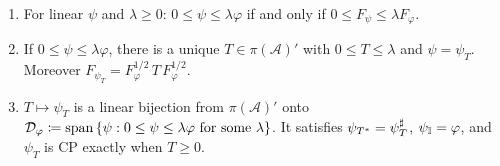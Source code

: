 \documentclass[12pt]{article}
\newcommand{\alg}{\mathcal{A}}             %
\newcommand{\Fphi}{F_{\varphi}}
\begin{document}
\begin{theorem}
\label{thm:rn}
\begin{enumerate}[label=(\alph*)]
  \item \label{it:rn-order}
    For linear \(\psi\) and \(\lambda \ge 0\): \(0 \le \psi \le \lambda\varphi\) if
    and only if \(0 \le F_\psi \le \lambda\Fphi\).
  \item \label{it:rn-T}
    If \(0 \le \psi \le \lambda\varphi\), there is a unique \(T \in \pi(\alg)'\) with
    \(0 \le T \le \lambda\) and \(\psi = \psi_T\). Moreover
    \(F_{\psi_T} = \Fphi^{1/2}\,T\,\Fphi^{1/2}\).
  \item \label{it:rn-alg}
    \(T \mapsto \psi_T\) is a linear bijection from \(\pi(\alg)'\) onto
    \(\mathcal{D}_\varphi \coloneqq \operatorname{span}\left\{ \psi : 0 \le \psi \le \lambda\varphi
    \text{ for some } \lambda \right\}\). It satisfies \(\psi_{T^*} = \psi_T^\sharp\),
    \(\psi_{{\mathbb I}} = \varphi\), and \(\psi_T\) is CP exactly when \(T \ge 0\).
\end{enumerate}
\end{theorem}
\end{document}
